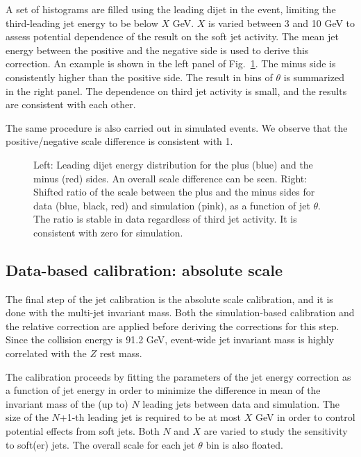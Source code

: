 A set of histograms are filled using the leading dijet in the event, limiting the third-leading jet energy to be below $X$ GeV.  $X$ is varied between 3 and 10 GeV to assess potential dependence of the result on the soft jet activity.  The mean jet energy between the positive and the negative side is used to derive this correction.  An example is shown in the left panel of Fig.~\ref{Figure:JetCalibration-ResidualSide}.  The minus side is consistently higher than the positive side.  The result in bins of $\theta$ is summarized in the right panel.  The dependence on third jet activity is small, and the results are consistent with each other.

The same procedure is also carried out in simulated events.  We observe that the positive/negative scale difference is consistent with 1.


\begin{figure}[htp!]
    \centering
    \caption{Left: Leading dijet energy distribution for the plus (blue) and the minus (red) sides.  An overall scale difference can be seen.  Right: Shifted ratio of the scale between the plus and the minus sides for data (blue, black, red) and simulation (pink), as a function of jet $\theta$.  The ratio is stable in data regardless of third jet activity.  It is consistent with zero for simulation.}
    \label{Figure:JetCalibration-ResidualSide}
\end{figure}

\clearpage

\subsection{Data-based calibration: absolute scale}
\label{Subsection:AbsoluteScale}

The final step of the jet calibration is the absolute scale calibration, and it is done with the multi-jet invariant mass.  Both the simulation-based calibration and the relative correction are applied before deriving the corrections for this step.  Since the collision energy is 91.2 GeV, event-wide jet invariant mass is highly correlated with the $Z$ rest mass.

The calibration proceeds by fitting the parameters of the jet energy correction as a function of jet energy in order to minimize the difference in mean of the invariant mass of the (up to) $N$ leading jets between data and simulation.  The size of the $N$+1-th leading jet is required to be at most $X$ GeV in order to control potential effects from soft jets.  Both $N$ and $X$ are varied to study the sensitivity to soft(er) jets.  The overall scale for each jet $\theta$ bin is also floated.

